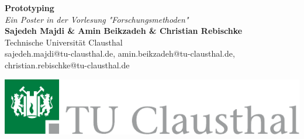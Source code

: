 \documentclass[a0,portrait]{a0poster}
\begin{document}


\begin{minipage}[b]{0.75\linewidth}
\veryHuge \color{Green} \textbf{Prototyping} \color{Black}\\ %
\Huge\textit{Ein Poster in der Vorlesung "Forschungsmethoden"}\\[2cm] %
    \huge \textbf{Sajedeh Majdi \& Amin Beikzadeh \& Christian Rebischke}\\[0.5cm] %
\huge Technische Universität Clausthal\\[0.4cm] %
\Large sajedeh.majdi@tu-clausthal.de, amin.beikzadeh@tu-clausthal.de, christian.rebischke@tu-clausthal.de\\
\end{minipage}
%
\begin{minipage}[b]{0.25\linewidth}
\includegraphics[width=20cm]{Logo_TUC_de_CMYK.pdf}\\
\end{minipage}

\vspace{1cm} %

\end{document}
